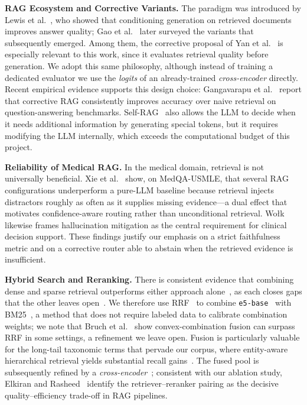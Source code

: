 \documentclass[runningheads]{llncs}
\begin{document}
\textbf{RAG Ecosystem and Corrective Variants.} The paradigm was introduced by Lewis et al.~\cite{lewis2020retrieval}, who showed that conditioning generation on retrieved documents improves answer quality; Gao et al.~\cite{gao2024retrieval} later surveyed the variants that subsequently emerged. Among them, the corrective proposal of Yan et al.~\cite{yan2024crag} is especially relevant to this work, since it evaluates retrieval quality before generation. We adopt this same philosophy, although instead of training a dedicated evaluator we use the \emph{logits} of an already-trained \emph{cross-encoder} directly. Recent empirical evidence supports this design choice: Gangavarapu et al.~\cite{gangavarapu2025corrective} report that corrective RAG consistently improves accuracy over naive retrieval on question-answering benchmarks. Self-RAG~\cite{asai2024selfrag} also allows the LLM to decide when it needs additional information by generating special tokens, but it requires modifying the LLM internally, which exceeds the computational budget of this project.

\textbf{Reliability of Medical RAG.} In the medical domain, retrieval is not universally beneficial. Xie et al.~\cite{xie2026retrievalhurts} show, on MedQA-USMLE, that several RAG configurations underperform a pure-LLM baseline because retrieval injects distractors roughly as often as it supplies missing evidence---a dual effect that motivates confidence-aware routing rather than unconditional retrieval. Wo{\l}k~\cite{wolk2025clinical} likewise frames hallucination mitigation as the central requirement for clinical decision support. These findings justify our emphasis on a strict faithfulness metric and on a corrective router able to abstain when the retrieved evidence is insufficient.

\textbf{Hybrid Search and Reranking.} There is consistent evidence that combining dense and sparse retrieval outperforms either approach alone~\cite{karpukhin2020dense}, as each closes gaps that the other leaves open~\cite{sinha2026lexicalsemantic}. We therefore use RRF~\cite{cormack2009rrf} to combine \texttt{e5-base}~\cite{wang2024e5} with BM25~\cite{robertson2009bm25}, a method that does not require labeled data to calibrate combination weights; we note that Bruch et al.~\cite{bruch2023fusion} show convex-combination fusion can surpass RRF in some settings, a refinement we leave open. Fusion is particularly valuable for the long-tail taxonomic terms that pervade our corpus, where entity-aware hierarchical retrieval yields substantial recall gains~\cite{peng2026hce}. The fused pool is subsequently refined by a \emph{cross-encoder}~\cite{nogueira2019passage}; consistent with our ablation study, Elkiran and Rasheed~\cite{elkiran2026rerankerpairings} identify the retriever--reranker pairing as the decisive quality--efficiency trade-off in RAG pipelines.
\end{document}
